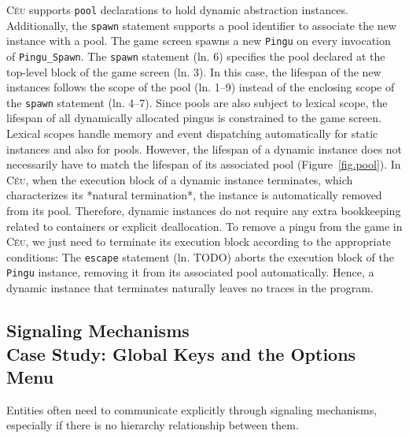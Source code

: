 \documentclass{vgtc}                          %
\newcommand{\CEU}{\textsc{C\'{e}u}\xspace}
\newcommand{\code}[1] {{\small{\texttt{#1}}}}
\begin{document}
\CEU supports \code{pool} declarations to hold dynamic abstraction instances.
Additionally, the \code{spawn} statement supports a pool identifier to
associate the new instance with a pool.
%
The game screen spawns a new \code{Pingu} on every invocation of
\code{Pingu\_Spawn}.
%
The \code{spawn} statement (ln. 6) specifies the pool declared at the top-level
block of the game screen (ln. 3).
In this case, the lifespan of the new instances follows the scope of the pool
(ln. 1--9) instead of the enclosing scope of the \code{spawn} statement
(ln. 4--7).
Since pools are also subject to lexical scope, the lifespan of all dynamically
allocated pingus is constrained to the game screen.
%
Lexical scopes handle memory and event dispatching automatically for static
instances and also for pools.
However, the lifespan of a dynamic instance does not necessarily have to match
the lifespan of its associated pool (Figure~\ref{fig.pool}).
In \CEU, when the execution block of a dynamic instance terminates, which
characterizes its *natural termination*, the instance is automatically removed
from its pool.
Therefore, dynamic instances do not require any extra bookkeeping related to 
containers or explicit deallocation.
%
To remove a pingu from the game in \CEU, we just need to terminate its execution
block according to the appropriate conditions:
%
The \code{escape} statement (ln. TODO) aborts the execution block of the
\code{Pingu} instance, removing it from its associated pool automatically.
Hence, a dynamic instance that terminates naturally leaves no traces in the 
program.

\subsection{Signaling Mechanisms\\ Case Study: Global Keys and the Options Menu}

Entities often need to communicate explicitly through signaling mechanisms,
especially if there is no hierarchy relationship between them.
\end{document}
